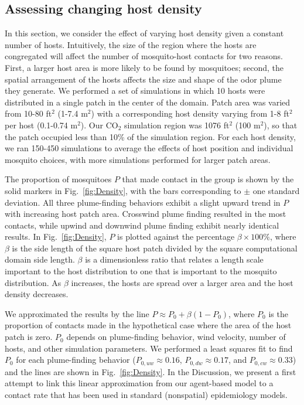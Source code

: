 \documentclass[10pt]{article}
\begin{document}
\subsection*{Assessing changing host density}\label{sec:res:hostdens}
In this section, we consider the effect of varying host density given a constant number of hosts.  Intuitively, the size of the region where the hosts are congregated will affect the number of mosquito-host contacts for two reasons.  First, a larger host area is more likely to be found by mosquitoes; second, the spatial arrangement of the hosts affects the size and shape of the odor plume they generate. 
%
We performed a set of simulations in which 10 hosts were distributed in a single patch in the center of the domain. Patch area was varied from 10-80 ft$^2$ (1-7.4 m$^2$) with a corresponding host density varying from 1-8 ft$^2$ per host (0.1-0.74 m$^2$). Our CO$_2$ simulation region was 1076 ft$^2$ (100 m$^2$), so that the patch occupied less than 10\% of the simulation region. For each host density, we ran 150-450 simulations to average the effects of host position and individual mosquito choices, with more simulations performed for larger patch areas.

The proportion of mosquitoes $P$ that made contact in the group is shown by the solid markers in Fig.~\ref{fig:Density}, with the bars corresponding to $\pm$ one standard deviation. 
All three plume-finding behaviors exhibit a slight upward trend in $P$ with increasing host patch area. Crosswind plume finding resulted in the most contacts, while upwind and downwind plume finding exhibit nearly identical results. 
In Fig.~\ref{fig:Density}, $P$ is plotted against the percentage $\beta \times 100\%$, where $\beta$ is the side length of the square host patch divided by the square computational domain side length. $\beta$ is a dimensionless ratio that relates a length scale important to the host distribution to one that is important to the mosquito distribution. As $\beta$ increases, the hosts are spread over a larger area and the host density decreases.

We approximated the results by the line $P  \approx P_0 + \beta(1-P_0)$, where $P_0$ is the proportion of contacts made in the hypothetical case where the area of the host patch is zero. $P_0$ depends on plume-finding behavior, wind velocity, number of hosts, and other simulation parameters. We performed a least squares fit to find $P_0$ for each plume-finding behavior ($P_{0,uw} \approx 0.16$, $P_{0,dw} \approx 0.17$, and $P_{0,cw} \approx 0.33$) and the lines are shown in Fig.~\ref{fig:Density}. 
In the Discussion, we present a first attempt to link this linear approximation from our agent-based model to a contact rate that has been used in standard (nonspatial) epidemiology models. 
\end{document}
